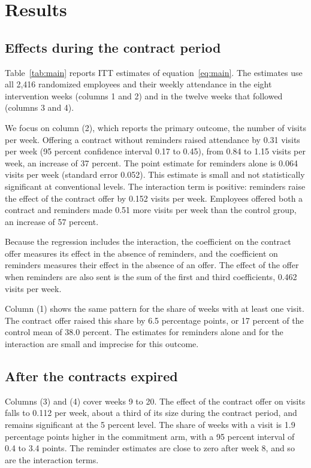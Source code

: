 \section{Results}
\label{sec:results}

\subsection{Effects during the contract period}
Table~\ref{tab:main} reports ITT estimates of equation~\eqref{eq:main}. The estimates use all 2,416 randomized employees and their weekly attendance in the eight intervention weeks (columns 1 and 2) and in the twelve weeks that followed (columns 3 and 4).

We focus on column (2), which reports the primary outcome, the number of visits per week. Offering a contract without reminders raised attendance by 0.31 visits per week (95 percent confidence interval 0.17 to 0.45), from 0.84 to 1.15 visits per week, an increase of 37 percent. The point estimate for reminders alone is 0.064 visits per week (standard error 0.052). This estimate is small and not statistically significant at conventional levels. The interaction term is positive: reminders raise the effect of the contract offer by 0.152 visits per week. Employees offered both a contract and reminders made 0.51 more visits per week than the control group, an increase of 57 percent.

Because the regression includes the interaction, the coefficient on the contract offer measures its effect in the absence of reminders, and the coefficient on reminders measures their effect in the absence of an offer. The effect of the offer when reminders are also sent is the sum of the first and third coefficients, 0.462 visits per week.

Column (1) shows the same pattern for the share of weeks with at least one visit. The contract offer raised this share by 6.5 percentage points, or 17 percent of the control mean of 38.0 percent. The estimates for reminders alone and for the interaction are small and imprecise for this outcome.



\subsection{After the contracts expired}
Columns (3) and (4) cover weeks 9 to 20. The effect of the contract offer on visits falls to 0.112 per week, about a third of its size during the contract period, and remains significant at the 5 percent level. The share of weeks with a visit is 1.9 percentage points higher in the commitment arm, with a 95 percent interval of 0.4 to 3.4 points. The reminder estimates are close to zero after week 8, and so are the interaction terms.

